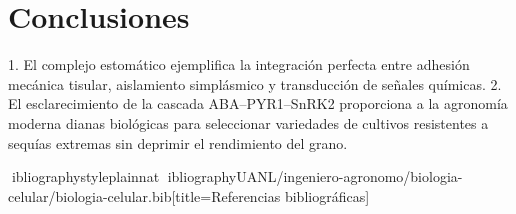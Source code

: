 \documentclass[spanish,letterpaper,oneside]{article}
\begin{document}
\section{Conclusiones}
1. El complejo estomático ejemplifica la integración perfecta entre adhesión mecánica tisular, aislamiento simplásmico y transducción de señales químicas.
2. El esclarecimiento de la cascada ABA--PYR1--SnRK2 proporciona a la agronomía moderna dianas biológicas para seleccionar variedades de cultivos resistentes a sequías extremas sin deprimir el rendimiento del grano.

\newpage
ibliographystyle{plainnat}
ibliography{UANL/ingeniero-agronomo/biologia-celular/biologia-celular.bib}[title={Referencias bibliográficas}]
\end{document}
